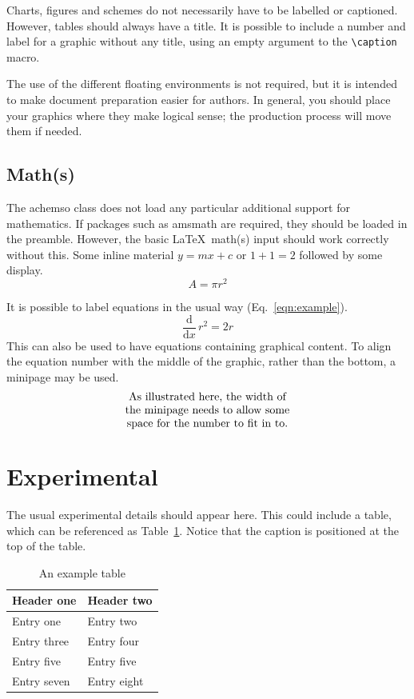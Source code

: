 \documentclass[journal=jacsat,manuscript=article]{achemso}
\begin{document}
Charts, figures and schemes do not necessarily have to be labelled or
captioned.  However, tables should always have a title. It is
possible to include a number and label for a graphic without any
title, using an empty argument to the \texttt{\textbackslash caption}
macro.

The use of the different floating environments is not required, but
it is intended to make document preparation easier for authors. In
general, you should place your graphics where they make logical
sense; the production process will move them if needed.

\subsection{Math(s)}

The \textsf{achemso} class does not load any particular additional
support for mathematics.  If packages such as \textsf{amsmath} are
required, they should be loaded in the preamble.  However,
the basic \LaTeX\ math(s) input should work correctly without
this.  Some inline material \( y = mx + c \) or $ 1 + 1 = 2 $
followed by some display. \[ A = \pi r^2 \]

It is possible to label equations in the usual way (Eq.~\ref{eqn:example}).
\begin{equation}
  \frac{\mathrm{d}}{\mathrm{d}x} \, r^2 = 2r \label{eqn:example}
\end{equation}
This can also be used to have equations containing graphical
content. To align the equation number with the middle of the graphic,
rather than the bottom, a minipage may be used.
\begin{equation}
  \begin{minipage}[c]{0.80\linewidth}
    \centering
    As illustrated here, the width of \\
    the minipage needs to allow some  \\
    space for the number to fit in to.
  \end{minipage}
  \label{eqn:graphic}
\end{equation}

\section{Experimental}

The usual experimental details should appear here.  This could
include a table, which can be referenced as Table~\ref{tbl:example}.
Notice that the caption is positioned at the top of the table.
\begin{table}
  \caption{An example table}
  \label{tbl:example}
  \begin{tabular}{ll}
    \hline
    Header one  & Header two  \\
    \hline
    Entry one   & Entry two   \\
    Entry three & Entry four  \\
    Entry five  & Entry five  \\
    Entry seven & Entry eight \\
    \hline
  \end{tabular}
\end{table}
\end{document}
